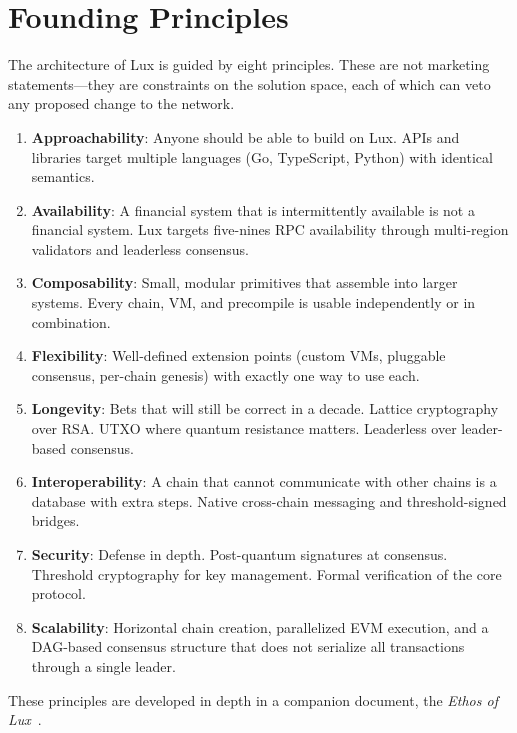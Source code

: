 \section{Founding Principles}


The architecture of Lux is guided by eight principles. These are not
marketing statements---they are constraints on the solution space,
each of which can veto any proposed change to the network.

\begin{enumerate}[leftmargin=*,nosep]
  \item \textbf{Approachability}: Anyone should be able to build on Lux.
        APIs and libraries target multiple languages (Go, TypeScript,
        Python) with identical semantics.
  \item \textbf{Availability}: A financial system that is intermittently
        available is not a financial system. Lux targets five-nines
        RPC availability through multi-region validators and
        leaderless consensus.
  \item \textbf{Composability}: Small, modular primitives that
        assemble into larger systems. Every chain, VM, and precompile
        is usable independently or in combination.
  \item \textbf{Flexibility}: Well-defined extension points (custom
        VMs, pluggable consensus, per-chain genesis) with exactly one
        way to use each.
  \item \textbf{Longevity}: Bets that will still be correct in a
        decade. Lattice cryptography over RSA. UTXO where quantum
        resistance matters. Leaderless over leader-based consensus.
  \item \textbf{Interoperability}: A chain that cannot communicate
        with other chains is a database with extra steps. Native
        cross-chain messaging and threshold-signed bridges.
  \item \textbf{Security}: Defense in depth. Post-quantum signatures
        at consensus. Threshold cryptography for key management.
        Formal verification of the core protocol.
  \item \textbf{Scalability}: Horizontal chain creation, parallelized
        EVM execution, and a DAG-based consensus structure that does
        not serialize all transactions through a single leader.
\end{enumerate}

These principles are developed in depth in a companion document, the
\emph{Ethos of Lux}~\cite{lux-ethos}.


